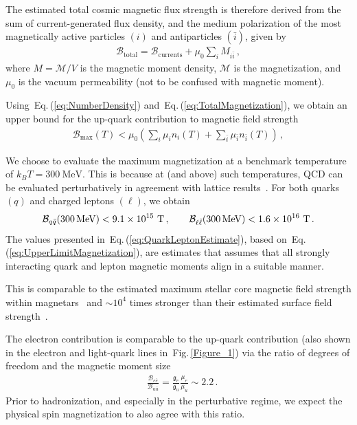 \documentclass[epjST]{svjour}
\newcommand*{\MeV}{\text{\,MeV}}
\newcommand{\req}[1]{Eq.\,(\ref{#1})}
\newcommand{\rf}[1]{Fig.\,{\ref{#1}}}
\begin{document}
The estimated total cosmic magnetic flux strength is therefore derived from the sum of current-generated flux density, and the medium polarization of the most magnetically active particles \((i)\) and antiparticles \((\bar{i})\), given by
\begin{align}
\label{eq:TotalMagnetization}
\mathcal{B}_\mathrm{total}=\mathcal{B}_\mathrm{currents}+\mu_{0}\sum_{i} M_{i\bar{i}}\,,
\end{align}
where \(M=\mathcal{M}/V\) is the magnetic moment density, \(\mathcal{M}\) is the magnetization, and \(\mu_{0}\) is the vacuum permeability (not to be confused with magnetic moment). {\color{blue}Using~\req{eq:NumberDensity} and~\req{eq:TotalMagnetization}, we obtain an upper bound for the up-quark contribution to magnetic field strength
\begin{align}
\label{eq:UpperLimitMagnetization}
\mathcal{B}_\mathrm{max}(T) < \mu_{0}\left(\sum_{i}\mu_{i}n_{i}(T)+\sum_{\bar{i}}\mu_{\bar{i}}n_{\bar{i}}(T)\right)\,,
\end{align}

We choose to evaluate the maximum magnetization at a benchmark temperature of \(k_{B}T=300~\mathrm{MeV}\). This is because at (and above) such temperatures, QCD can be evaluated perturbatively in agreement with lattice results~\cite{ParticleDataGroup:2024cfk}. For both quarks \((q)\) and charged leptons \((\ell)\), we obtain
\begin{equation}
\label{eq:QuarkLeptonEstimate}
\mathcal{B}_{q\bar{q}}(300\MeV) < 9.1\times10^{15}~\mathrm{T} \,,\qquad
\mathcal{B}_{\ell\bar{\ell}}(300\MeV) < 1.6\times10^{16}~\mathrm{T} \,.
\end{equation}
The values presented in~\req{eq:QuarkLeptonEstimate}, based on~\req{eq:UpperLimitMagnetization}, are estimates that assumes that all strongly interacting quark and lepton magnetic moments align in a suitable manner.} This is comparable to the estimated maximum stellar core magnetic field strength within magnetars~\cite{Ferrer:2010wz} and \(\sim 10^{4}\) times stronger than their estimated surface field strength~\cite{Kaspi:2017fwg}.


The electron contribution is comparable to the up-quark contribution (also shown in the electron and light-quark lines in~\rf{Figure_1}) via the ratio of degrees of freedom and the magnetic moment size
{\color{blue}\begin{align}
\label{eq:ElectronMagnetization}
&\frac{\mathcal{B}_{e\bar{e}}}{\mathcal{B}_{u\bar{u}}} = \frac{\mathfrak{g}_{e}}{\mathfrak{g}_{u}} \frac{\mu_{e}}{\mu_{u}} \sim 2.2\,.
\end{align}
Prior to hadronization, and especially in the perturbative regime, we expect the physical spin magnetization to also agree with this ratio.}
\end{document}
